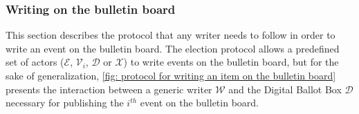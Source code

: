 \subsubsection{Writing on the bulletin board} \label{sec: writing on the bulletin board}
This section describes the protocol that any writer needs to follow in order to write an event on the bulletin board. The election protocol allows a predefined set of actors ($\mathcal{E}$, $\mathcal{V}_i$, $\mathcal{D}$ or $\mathcal{X}$) to write events on the bulletin board, but for the sake of generalization, \cref{fig: protocol for writing an item on the bulletin board} presents the interaction between a generic writer $\mathcal{W}$ and the Digital Ballot Box $\mathcal{D}$ necessary for publishing the $i^{th}$ event on the bulletin board.

\begin{figure}[ht]
    \centering
\end{figure}
